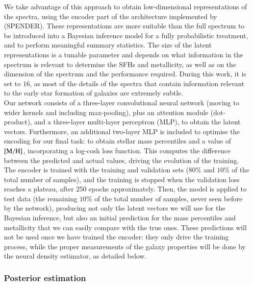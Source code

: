 We take advantage of this approach to obtain low-dimensional representations of the spectra, using the encoder part of the architecture implemented by \cite{melchior2022} (SPENDER). These representations are more suitable than the full spectrum to be introduced into a Bayesian inference model for a fully probabilistic treatment, and to perform meaningful summary statistics. The size of the latent representations is a tunable parameter and depends on what information in the spectrum is relevant to determine the SFHs and metallicity, as well as on the dimension of the spectrum and the performance required. During this work, it is set to $16$, as most of the details of the spectra that contain information relevant to the early star formation of galaxies are extremely subtle.\\

 Our network consists of a three-layer convolutional neural network (moving to wider kernels and including max-pooling), plus an attention module (dot-product), and a three-layer multi-layer perceptron (MLP), to obtain the latent vectors. Furthermore, an additional two-layer MLP is included to optimise the encoding for our final task: to obtain stellar mass percentiles and a value of $\rm{[M/H]}$, incorporating a log-cosh loss function. This computes the difference between the predicted and actual values, driving the evolution of the training. The encoder is trained with the training and validation sets ($80\%$ and $10\%$ of the total number of samples), and the training is stopped when the validation loss reaches a plateau, after 250 epochs approximately. Then, the model is applied to test data (the remaining $10\%$ of the total number of samples, never seen before by the network), producing not only the latent vectors we will use for the Bayesian inference, but also an initial prediction for the mass percentiles and metallicity that we can easily compare with the true ones. These predictions will not be used once we have trained the encoder: they only drive the training process, while the proper measurements of the galaxy properties will be done by the neural density estimator, as detailed below.\\





\subsubsection{Posterior estimation}
\label{normflows}


